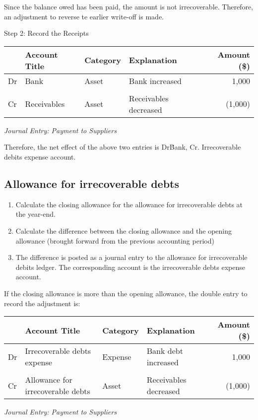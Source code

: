 Since the balance owed has been paid, the amount is not irrecoverable. Therefore, an adjustment to reverse te earlier write-off is made. 

Step 2: Record the Receipts

\begin{center} 
\begin{tabular}{@{} l l l l r @{}}
\toprule
& \textbf{Account Title} & \textbf{Category} & \textbf{Explanation} & \textbf{Amount (\$)} \\
\midrule
Dr & Bank & Asset & Bank increased & 1,000 \\
 & \quad  & \\
Cr & Receivables & Asset & Receivables decreased & (1,000) \\
\bottomrule
\end{tabular}
\end{center}
\vspace{1em}
\textit{Journal Entry: Payment to Suppliers}

Therefore, the net effect of the above two entries is Dr\. Bank, Cr. Irrecoverable debits expense account. 


\subsection{Allowance for irrecoverable debts}

\begin{enumerate}[label=\arabic*, resume] 
    \item Calculate the closing allowance for the allowance for irrecoverable debts at the year-end. 
    \item Calculate the difference between the closing allowance and the opening allowance (brought forward from the previous accounting period) 
    \item The difference is posted as a journal entry to the allowance for irrecoverable debits ledger. The corresponding account is the irrecoverable debts expense account. 
\end{enumerate}

If the closing allowance is more than the opening allowance, the double entry to record the adjustment is: 

\begin{center} 
\begin{tabular}{@{} l l l l r @{}}
\toprule
& \textbf{Account Title} & \textbf{Category} & \textbf{Explanation} & \textbf{Amount (\$)} \\
\midrule
Dr & Irrecoverable debts expense & Expense & Bank debt increased & 1,000 \\
 & \quad  & \\
Cr & Allowance for irrecoverable debts & Asset & Receivables decreased & (1,000) \\
\bottomrule
\end{tabular}
\end{center}
\vspace{1em}
\textit{Journal Entry: Payment to Suppliers}

